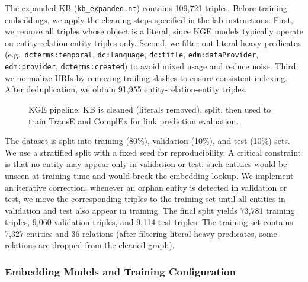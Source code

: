 \documentclass[11pt,a4paper]{article}
\begin{document}
  The expanded KB (\texttt{kb\_expanded.nt}) contains 109,721 triples. Before training embeddings, we apply the cleaning steps specified in the lab instructions. First, we remove all triples whose object is a literal, since KGE models typically operate on entity-relation-entity triples only. Second, we filter out literal-heavy predicates (e.g.\ \texttt{dcterms:temporal}, \texttt{dc:language}, \texttt{dc:title}, \texttt{edm:dataProvider}, \texttt{edm:provider}, \texttt{dcterms:created}) to avoid mixed usage and reduce noise. Third, we normalize URIs by removing trailing slashes to ensure consistent indexing. After deduplication, we obtain 91,955 entity-relation-entity triples.

  \begin{figure}[ht]
  \centering
  \caption{KGE pipeline: KB is cleaned (literals removed), split, then used to train TransE and ComplEx for link prediction evaluation.}
  \end{figure}

  The dataset is split into training (80\%), validation (10\%), and test (10\%) sets. We use a stratified split with a fixed seed for reproducibility. A critical constraint is that no entity may appear only in validation or test; such entities would be unseen at training time and would break the embedding lookup. We implement an iterative correction: whenever an orphan entity is detected in validation or test, we move the corresponding triples to the training set until all entities in validation and test also appear in training. The final split yields 73,781 training triples, 9,060 validation triples, and 9,114 test triples. The training set contains 7,327 entities and 36 relations (after filtering literal-heavy predicates, some relations are dropped from the cleaned graph).

  \subsubsection{Embedding Models and Training Configuration}
\end{document}
